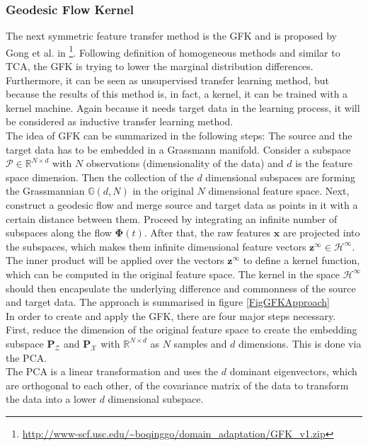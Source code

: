 \subsubsection{Geodesic Flow Kernel}
The next symmetric feature transfer method is the \ac{GFK} and is proposed by Gong et al. in \cite{Gong.}\footnote{\url{http://www-scf.usc.edu/~boqinggo/domain\_adaptation/GFK\_v1.zip}}.
Following definition of homogeneous methods and similar to \acs{TCA}, the \acl{GFK} is trying to lower the marginal distribution differences.\cite[p. 13]{Weiss.2016}\\
Furthermore, it can be seen as unsupervised transfer learning method, but because the results of this method is, in fact, a kernel, it can be trained with a kernel machine.\cite{Gong.}
Again because it needs target data in the learning process, it will be considered as inductive transfer learning method.\\
The idea of \acs{GFK} can be summarized in the following steps:
The source and the target data has to be embedded in a Grassmann manifold.
Consider a subspace $\mathcal{P} \in \mathbb{R}^{N \times d}$ with $N$ observations (dimensionality of the data) and $d$ is the feature space dimension.
Then the collection of the $d$ dimensional subspaces are forming the Grassmannian $\mathbb{G}(d, N)$ in the original $N$ dimensional feature space.
Next, construct a geodesic flow and merge source and target data as points in it with a certain distance between them.
Proceed by integrating an infinite number of subspaces along the flow $\boldsymbol{\Phi}(t)$.
After that, the raw features $\mathbf{x}$ are projected into the subspaces, which makes them infinite dimensional feature vectors $\mathbf{z}^\infty \in \mathcal{H}^\infty$.
The inner product will be applied over the vectors $\mathbf{z}^\infty$ to define a kernel function, which can be computed in the original feature space.
The kernel in the space $\mathcal{H}^\infty$ should then encapsulate the underlying difference and commonness of the source and target data.\cite{Gong.} The approach is summarised in figure \ref{FigGFKApproach}\\
In order to create and apply the \acl{GFK}, there are four major steps necessary.
First, reduce the dimension of the original feature space to create the embedding subspace $\mathbf{P}_\mathcal{Z}$ and $\mathbf{P}_\mathcal{X}$ with $\mathbb{R}^{N\times d}$ as $N$ samples and $d$ dimensions.
This is done via the \ac{PCA}.\cite{Gong.}\\
The \acs{PCA} is a linear transformation and uses the $d$ dominant eigenvectors, which are orthogonal to each other, of the covariance matrix of the data to transform the data into a lower $d$ dimensional subspace.
